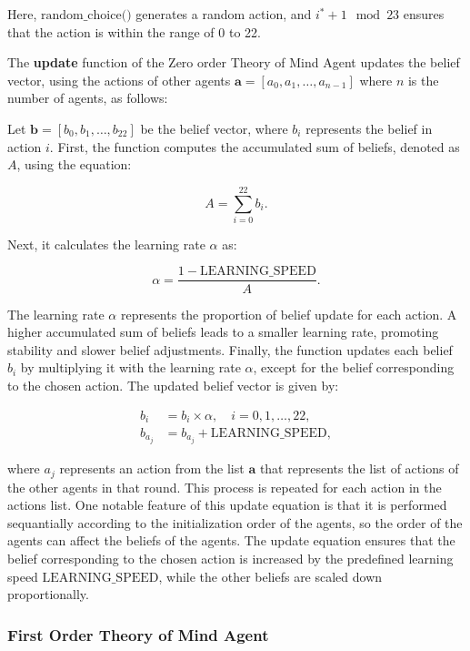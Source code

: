 Here, $\text{{random\_choice()}}$ generates a random action, and $i^* + 1 \mod 23$ ensures that the action is within the range of 0 to 22.

The \textbf{update} function of the Zero order Theory of Mind Agent updates the belief vector, using the actions of other agents $\mathbf{a} = [a_0, a_1, \ldots, a_{n-1}]$ where $n$ is the number of agents, as follows: 

\label{eq:zero-order-update}
Let $\mathbf{b} = [b_0, b_1, \ldots, b_{22}]$ be the belief vector, where $b_i$ represents the belief in action $i$. First, the function computes the accumulated sum of beliefs, denoted as $A$, using the equation:

\[
A = \sum_{i=0}^{22} b_i.
\]

Next, it calculates the learning rate $\alpha$ as:

\[
\alpha = \frac{{1 - \text{{LEARNING\_SPEED}}}}{{A}}.
\]

The learning rate $\alpha$ represents the proportion of belief update for each action. A higher accumulated sum of beliefs leads to a smaller learning rate, promoting stability and slower belief adjustments. Finally, the function updates each belief $b_i$ by multiplying it with the learning rate $\alpha$, except for the belief corresponding to the chosen action. The updated belief vector is given by:

\[
\begin{aligned}
b_i & = b_i \times \alpha, \quad i = 0, 1, \ldots, 22, \quad\\
b_{a_{j}} & = b_{a_{j}} + \text{{LEARNING\_SPEED}},
\end{aligned}
\]

where $a_j$ represents an action from the list $\mathbf{a}$ that represents the list of actions of the other agents in that round. This process is repeated for each action in the actions list. One notable feature of this update equation is that it is performed sequantially according to the initialization order of the agents, so the order of the agents can affect the beliefs of the agents. The update equation ensures that the belief corresponding to the chosen action is increased by the predefined learning speed $\text{{LEARNING\_SPEED}}$, while the other beliefs are scaled down proportionally.

\subsubsection{First Order Theory of Mind Agent}

